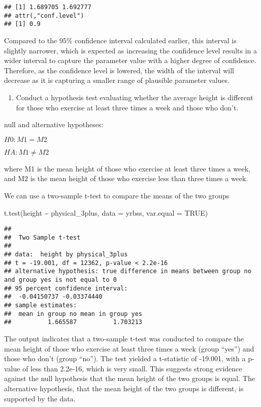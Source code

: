 \documentclass[
]{article}
\newenvironment{Shaded}{\begin{snugshade}}{\end{snugshade}}
\newcommand{\AttributeTok}[1]{\textcolor[rgb]{0.77,0.63,0.00}{#1}}
\newcommand{\ConstantTok}[1]{\textcolor[rgb]{0.00,0.00,0.00}{#1}}
\newcommand{\FunctionTok}[1]{\textcolor[rgb]{0.00,0.00,0.00}{#1}}
\newcommand{\NormalTok}[1]{#1}
\newcommand{\SpecialCharTok}[1]{\textcolor[rgb]{0.00,0.00,0.00}{#1}}
\providecommand{\tightlist}{%
  \setlength{\itemsep}{0pt}\setlength{\parskip}{0pt}}
\begin{document}
\begin{verbatim}
## [1] 1.689705 1.692777
## attr(,"conf.level")
## [1] 0.9
\end{verbatim}

Compared to the 95\% confidence interval calculated earlier, this
interval is slightly narrower, which is expected as increasing the
confidence level results in a wider interval to capture the parameter
value with a higher degree of confidence. Therefore, as the confidence
level is lowered, the width of the interval will decrease as it is
capturing a smaller range of plausible parameter values.

\begin{enumerate}
\def\labelenumi{\arabic{enumi}.}
\setcounter{enumi}{9}
\tightlist
\item
  Conduct a hypothesis test evaluating whether the average height is
  different for those who exercise at least three times a week and those
  who don't.
\end{enumerate}

null and alternative hypotheses:

\(H0: M1 = M2\)

\(HA: M1 ≠ M2\)

where M1 is the mean height of those who exercise at least three times a
week, and M2 is the mean height of those who exercise less than three
times a week.

We can use a two-sample t-test to compare the means of the two groups

\begin{Shaded}
\begin{Highlighting}[]
\FunctionTok{t.test}\NormalTok{(height }\SpecialCharTok{\textasciitilde{}}\NormalTok{ physical\_3plus, }\AttributeTok{data =}\NormalTok{ yrbss, }\AttributeTok{var.equal =} \ConstantTok{TRUE}\NormalTok{)}
\end{Highlighting}
\end{Shaded}

\begin{verbatim}
## 
##  Two Sample t-test
## 
## data:  height by physical_3plus
## t = -19.001, df = 12362, p-value < 2.2e-16
## alternative hypothesis: true difference in means between group no and group yes is not equal to 0
## 95 percent confidence interval:
##  -0.04150737 -0.03374440
## sample estimates:
##  mean in group no mean in group yes 
##          1.665587          1.703213
\end{verbatim}

The output indicates that a two-sample t-test was conducted to compare
the mean height of those who exercise at least three times a week (group
``yes'') and those who don't (group ``no''). The test yielded a
t-statistic of -19.001, with a p-value of less than 2.2e-16, which is
very small. This suggests strong evidence against the null hypothesis
that the mean height of the two groups is equal. The alternative
hypothesis, that the mean height of the two groups is different, is
supported by the data.
\end{document}
